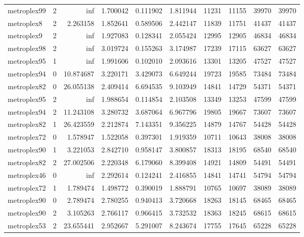 \begin{longtable}{|l|r|r|r|r|r|r|r|r|r|}
metroplex99 & 2 & inf & 1.700042 & 0.111902 & 1.811944 & 11231 & 11155 & 39970 & 39970 \\
metroplex8 & 2 & 2.263158 & 1.852641 & 0.589506 & 2.442147 & 11839 & 11751 & 41437 & 41437 \\
metroplex9 & 2 & inf & 1.927083 & 0.128341 & 2.055424 & 12995 & 12905 & 46834 & 46834 \\
metroplex98 & 2 & inf & 3.019724 & 0.155263 & 3.174987 & 17239 & 17115 & 63627 & 63627 \\
metroplex95 & 1 & inf & 1.991606 & 0.102010 & 2.093616 & 13301 & 13205 & 47527 & 47527 \\
metroplex94 & 0 & 10.874687 & 3.220171 & 3.429073 & 6.649244 & 19723 & 19585 & 73484 & 73484 \\
metroplex82 & 0 & 26.055138 & 2.409414 & 6.694535 & 9.103949 & 14841 & 14729 & 54371 & 54371 \\
metroplex95 & 2 & inf & 1.988654 & 0.114854 & 2.103508 & 13349 & 13253 & 47599 & 47599 \\
metroplex94 & 2 & 11.243108 & 3.280732 & 3.687064 & 6.967796 & 19805 & 19667 & 73607 & 73607 \\
metroplex82 & 1 & 26.423559 & 2.212874 & 7.143351 & 9.356225 & 14879 & 14767 & 54428 & 54428 \\
metroplex72 & 0 & 1.578947 & 1.522058 & 0.397301 & 1.919359 & 10711 & 10643 & 38008 & 38008 \\
metroplex90 & 1 & 3.221053 & 2.842710 & 0.958147 & 3.800857 & 18313 & 18195 & 68540 & 68540 \\
metroplex82 & 2 & 27.002506 & 2.220348 & 6.179060 & 8.399408 & 14921 & 14809 & 54491 & 54491 \\
metroplex46 & 0 & inf & 2.292614 & 0.124241 & 2.416855 & 14841 & 14741 & 54794 & 54794 \\
metroplex72 & 1 & 1.789474 & 1.498772 & 0.390019 & 1.888791 & 10765 & 10697 & 38089 & 38089 \\
metroplex90 & 0 & 2.789474 & 2.780255 & 0.940413 & 3.720668 & 18263 & 18145 & 68465 & 68465 \\
metroplex90 & 2 & 3.105263 & 2.766117 & 0.966415 & 3.732532 & 18363 & 18245 & 68615 & 68615 \\
metroplex53 & 2 & 23.655441 & 2.952667 & 5.291007 & 8.243674 & 17755 & 17645 & 65228 & 65228 \\
\end{longtable}
